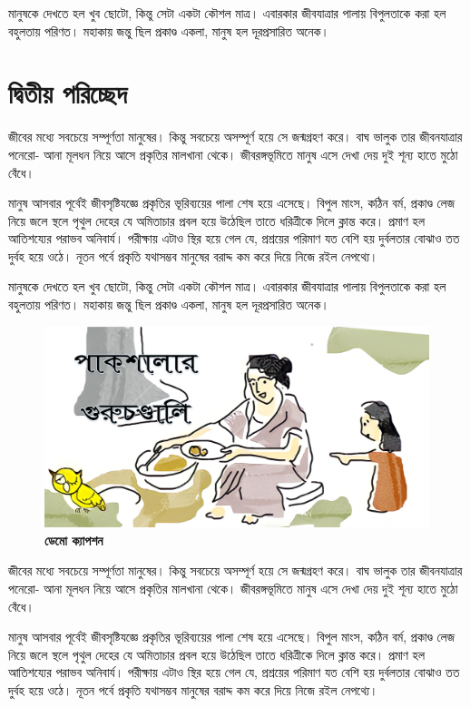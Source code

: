মানুষকে দেখতে হল খুব ছোটো, কিন্তু সেটা একটা কৌশল মাত্র। এবারকার জীবযাত্রার পালায় বিপুলতাকে করা হল বহুলতায় পরিণত। মহাকায় জন্তু ছিল প্রকাণ্ড একলা, মানুষ হল দূরপ্রসারিত অনেক।

\section{দ্বিতীয় পরিচ্ছেদ}
জীবের মধ্যে সবচেয়ে সম্পূর্ণতা মানুষের। কিন্তু সবচেয়ে অসম্পূর্ণ হয়ে সে জন্মগ্রহণ করে। বাঘ ভালুক তার জীবনযাত্রার পনেরো- আনা মূলধন নিয়ে আসে প্রকৃতির মালখানা থেকে। জীবরঙ্গভূমিতে মানুষ এসে দেখা দেয় দুই শূন্য হাতে মুঠো বেঁধে।

মানুষ আসবার পূর্বেই জীবসৃষ্টিযজ্ঞে প্রকৃতির ভূরিব্যয়ের পালা শেষ হয়ে এসেছে। বিপুল মাংস, কঠিন বর্ম, প্রকাণ্ড লেজ নিয়ে জলে স্থলে পৃথুল দেহের যে অমিতাচার প্রবল হয়ে উঠেছিল তাতে ধরিত্রীকে দিলে ক্লান্ত করে। প্রমাণ হল আতিশয্যের পরাভব অনিবার্য। পরীক্ষায় এটাও স্থির হয়ে গেল যে, প্রশ্রয়ের পরিমাণ যত বেশি হয় দুর্বলতার বোঝাও তত দুর্বহ হয়ে ওঠে। নূতন পর্বে প্রকৃতি যথাসম্ভব মানুষের বরাদ্দ কম করে দিয়ে নিজে রইল নেপথ্যে।

মানুষকে দেখতে হল খুব ছোটো, কিন্তু সেটা একটা কৌশল মাত্র। এবারকার জীবযাত্রার পালায় বিপুলতাকে করা হল বহুলতায় পরিণত। মহাকায় জন্তু ছিল প্রকাণ্ড একলা, মানুষ হল দূরপ্রসারিত অনেক।
\begin{figure}
	\centering
	\includegraphics[width=\linewidth]{Images/DemoPic1.png}
	\caption{\small \textbf{ডেমো ক্যাপশন}}
\end{figure}

জীবের মধ্যে সবচেয়ে সম্পূর্ণতা মানুষের। কিন্তু সবচেয়ে অসম্পূর্ণ হয়ে সে জন্মগ্রহণ করে। বাঘ ভালুক তার জীবনযাত্রার পনেরো- আনা মূলধন নিয়ে আসে প্রকৃতির মালখানা থেকে। জীবরঙ্গভূমিতে মানুষ এসে দেখা দেয় দুই শূন্য হাতে মুঠো বেঁধে।

মানুষ আসবার পূর্বেই জীবসৃষ্টিযজ্ঞে প্রকৃতির ভূরিব্যয়ের পালা শেষ হয়ে এসেছে। বিপুল মাংস, কঠিন বর্ম, প্রকাণ্ড লেজ নিয়ে জলে স্থলে পৃথুল দেহের যে অমিতাচার প্রবল হয়ে উঠেছিল তাতে ধরিত্রীকে দিলে ক্লান্ত করে। প্রমাণ হল আতিশয্যের পরাভব অনিবার্য। পরীক্ষায় এটাও স্থির হয়ে গেল যে, প্রশ্রয়ের পরিমাণ যত বেশি হয় দুর্বলতার বোঝাও তত দুর্বহ হয়ে ওঠে। নূতন পর্বে প্রকৃতি যথাসম্ভব মানুষের বরাদ্দ কম করে দিয়ে নিজে রইল নেপথ্যে।

